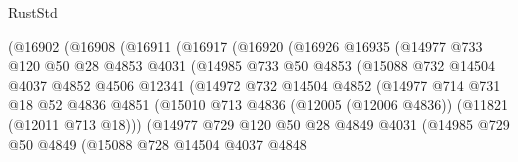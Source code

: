 \begin{lexlean}{RustStd}
\begin{coremodule}
                    (@16902
                      (@16908
                        (@16911
                          (@16917
                            (@16920
                              (@16926
                                @16935
                                (@14977
                                  @733
                                  @120
                                  @50
                                  @28
                                  @4853
                                  @4031
                                  (@14985
                                    @733
                                    @50
                                    @4853
                                    (@15088
                                      @732
                                      @14504
                                      @4037
                                      @4852
                                      @4506
                                      @12341
                                      (@14972
                                        @732
                                        @14504
                                        @4852
                                        (@14977
                                          @714
                                          @731
                                          @18
                                          @52
                                          @4836
                                          @4851
                                          (@15010
                                            @713
                                            @4836
                                            (@12005 (@12006 @4836))
                                            (@11821 (@12011 @713 @18)))
                                          (@14977
                                            @729
                                            @120
                                            @50
                                            @28
                                            @4849
                                            @4031
                                            (@14985
                                              @729
                                              @50
                                              @4849
                                              (@15088
                                                @728
                                                @14504
                                                @4037
                                                @4848

\end{coremodule}
\end{lexlean}
